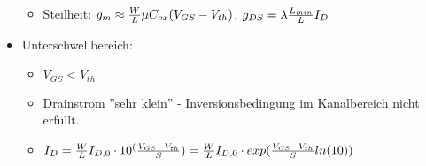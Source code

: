 \documentclass[european]{latex4ei_sheet}
\begin{document}
\begin{sectionbox}
\begin{itemize}
\begin{itemize}
                \item Steilheit: $ g_m \approx {W \over L} \mu C_{ox} (V_{GS} - V_{th}) $, $ g_{DS} = \lambda {L_{min} \over L} I_D $
            \end{itemize}
        \item Unterschwellbereich:
            \begin{itemize}
                \item $ V_{GS} < V_{th} $
                \item Drainstrom ''sehr klein'' - Inversionsbedingung im Kanalbereich nicht erfüllt.
                \item $ I_D = {W \over L} I_{D,0} \cdot 10^({V_{GS}-V_{th} \over S}) = {W \over L} I_{D,0} \cdot exp({V_{GS}-V_{th} \over S} ln(10)) $
            \end{itemize}
    \end{itemize}

\end{sectionbox}
\end{document}
